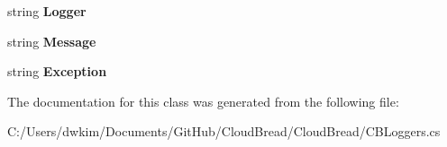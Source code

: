 \begin{DoxyCompactItemize}
\item 
string {\bfseries Logger}\hypertarget{class_logger_1_1_logging_1_1_logging_1_1_c_b_loggers_a3ecf08bc40529225da9595b08b380b88}{}\label{class_logger_1_1_logging_1_1_logging_1_1_c_b_loggers_a3ecf08bc40529225da9595b08b380b88}

\item 
string {\bfseries Message}\hypertarget{class_logger_1_1_logging_1_1_logging_1_1_c_b_loggers_a04615dd7cf88063853227fa1cd96b0d1}{}\label{class_logger_1_1_logging_1_1_logging_1_1_c_b_loggers_a04615dd7cf88063853227fa1cd96b0d1}

\item 
string {\bfseries Exception}\hypertarget{class_logger_1_1_logging_1_1_logging_1_1_c_b_loggers_a33addd1cc6e0f3c00151e64a711aad2d}{}\label{class_logger_1_1_logging_1_1_logging_1_1_c_b_loggers_a33addd1cc6e0f3c00151e64a711aad2d}

\end{DoxyCompactItemize}


The documentation for this class was generated from the following file\+:\begin{DoxyCompactItemize}
\item 
C\+:/\+Users/dwkim/\+Documents/\+Git\+Hub/\+Cloud\+Bread/\+Cloud\+Bread/C\+B\+Loggers.\+cs\end{DoxyCompactItemize}
